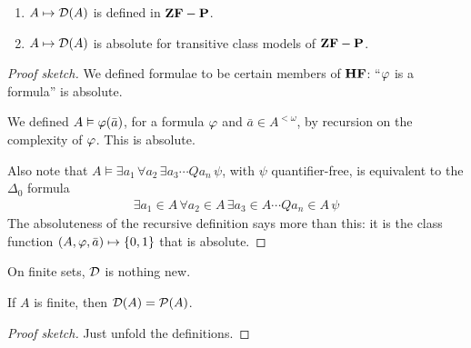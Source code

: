 \begin{boxlemma} \label{Ch4:Lemma:D_Absolute} \hfill
    \begin{enumerate}
        \item $A \mapsto \mathcal{D}\!\left( A \right)$ is defined in $\mathbf{ZF} - \mathbf{P}$.
        \item $A \mapsto \mathcal{D}\!\left( A \right)$ is absolute for transitive class models of $\mathbf{ZF} - \mathbf{P}$.
    \end{enumerate}
\end{boxlemma}
\begin{proof}[Proof sketch]
    We defined formulae to be certain members of $\mathbf{HF}$: ``$\varphi$ is a formula'' is absolute.

    We defined $A \vDash \varphi\!\left( \bar{a} \right)$, for a formula $\varphi$ and $\bar{a} \in A^{<\omega}$, by recursion on the complexity of $\varphi$. This is absolute.

    Also note that $A \models \exists a_1 \, \forall a_2 \, \exists a_3 \cdots Q a_n \, \psi$, with $\psi$ quantifier-free, is equivalent to the $\Delta_0$ formula
    \begin{align*}
        \exists a_1 \in A \, \forall a_2 \in A \, \exists a_3 \in A \cdots Q a_n \in A \, \psi
    \end{align*}
    The absoluteness of the recursive definition says more than this: it is the class function $\left( A, \varphi, \bar{a} \right) \mapsto \left\{ 0, 1 \right\}$ that is absolute.
\end{proof}

On finite sets, $\mathcal{D}$ is nothing new.

\begin{boxlemma}
    If $A$ is finite, then $\mathcal{D}(A) = \mathcal{P}(A)$.
\end{boxlemma}
\begin{proof}[Proof sketch]
    Just unfold the definitions.
\end{proof}
